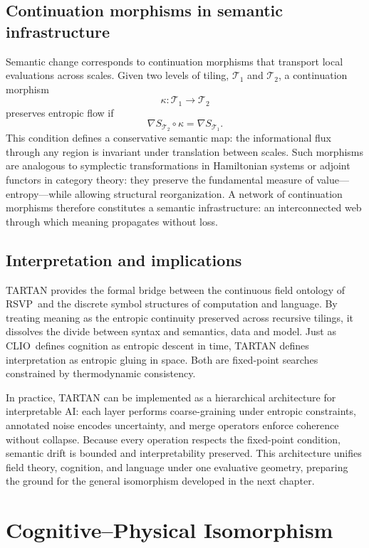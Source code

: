 \documentclass[12pt,a4paper]{article}
\newcommand{\RSVP}{RSVP}              %
\newcommand{\CLIO}{CLIO}              %
\theoremstyle{plain}
\begin{document}
\subsection{Continuation morphisms in semantic infrastructure}
Semantic change corresponds to continuation morphisms that transport local evaluations across scales.  
Given two levels of tiling, \(\mathcal{T}_1\) and \(\mathcal{T}_2\),
a continuation morphism
\[
\kappa: \mathcal{T}_1 \to \mathcal{T}_2
\]
preserves entropic flow if
\[
\nabla S_{\mathcal{T}_2}\circ \kappa
  = \nabla S_{\mathcal{T}_1}.
\]
This condition defines a conservative semantic map:
the informational flux through any region is invariant under translation between scales.
Such morphisms are analogous to symplectic transformations in Hamiltonian systems or adjoint functors in category theory: they preserve the fundamental measure of value---entropy---while allowing structural reorganization.
A network of continuation morphisms therefore constitutes a semantic infrastructure: an interconnected web through which meaning propagates without loss.

\subsection{Interpretation and implications}
TARTAN provides the formal bridge between the continuous field ontology of \RSVP\ and the discrete symbol structures of computation and language.
By treating meaning as the entropic continuity preserved across recursive tilings,
it dissolves the divide between syntax and semantics, data and model.
Just as \CLIO\ defines cognition as entropic descent in time,
TARTAN defines interpretation as entropic gluing in space.
Both are fixed-point searches constrained by thermodynamic consistency.

In practice, TARTAN can be implemented as a hierarchical architecture for interpretable AI:
each layer performs coarse-graining under entropic constraints,
annotated noise encodes uncertainty,
and merge operators enforce coherence without collapse.
Because every operation respects the fixed-point condition, 
semantic drift is bounded and interpretability preserved.
This architecture unifies field theory, cognition, and language under one evaluative geometry,
preparing the ground for the general isomorphism developed in the next chapter.


\section{Cognitive--Physical Isomorphism}
\label{sec:cognitive-physical}
\end{document}
